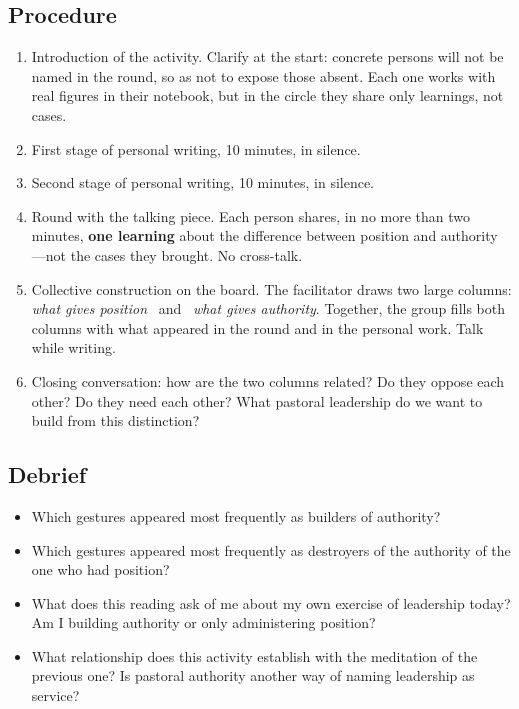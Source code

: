 \documentclass[11pt, a4paper]{article}
\begin{document}
\begin{actividad}
\subsection*{Procedure}
\begin{enumerate}[label={\arabic*.}]
  \item Introduction of the activity. Clarify at the start: concrete persons will not be named in the round, so as not to expose those absent. Each one works with real figures in their notebook, but in the circle they share only learnings, not cases.
  \item First stage of personal writing, 10 minutes, in silence.
  \item Second stage of personal writing, 10 minutes, in silence.
  \item Round with the talking piece. Each person shares, in no more than two minutes, \textbf{one learning} about the difference between position and authority ---not the cases they brought. No cross-talk.
  \item Collective construction on the board. The facilitator draws two large columns: \emph{what gives position} \ and \ \emph{what gives authority}. Together, the group fills both columns with what appeared in the round and in the personal work. Talk while writing.
  \item Closing conversation: how are the two columns related? Do they oppose each other? Do they need each other? What pastoral leadership do we want to build from this distinction?
\end{enumerate}

\subsection*{Debrief}
\begin{itemize}
  \item Which gestures appeared most frequently as builders of authority?
  \item Which gestures appeared most frequently as destroyers of the authority of the one who had position?
  \item What does this reading ask of me about my own exercise of leadership today? Am I building authority or only administering position?
  \item What relationship does this activity establish with the meditation of the previous one? Is pastoral authority another way of naming leadership as service?
\end{itemize}


\end{actividad}
\end{document}
